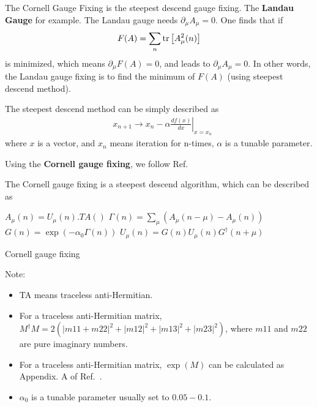 The Cornell Gauge Fixing is the steepest descend gauge fixing. The \textbf{Landau Gauge} for example. The Landau gauge needs $\partial _{\mu}A_{\mu}=0$. One finds that if
\begin{equation}
\begin{split}
&F(A)=\sum _n{\rm tr}\left[A_{\mu}^2(n)\right]\\
\end{split}
\end{equation}
is minimized, which means $\partial _{\mu}F(A)=0$, and leads to $\partial _{\mu}A_{\mu}=0$. In other words, the Landau gauge fixing is to find the minimum of $F(A)$ (using steepest descend method).

The steepest descend method can be simply described as
\begin{equation}
\begin{split}
&x_{n+1}\to x_n - \alpha \left.\frac{d f(x)}{dx}\right|_{x=x_n}
\end{split}
\end{equation}
where $x$ is a vector, and $x_n$ means iteration for n-times, $\alpha$ is a tunable parameter.

Using the \textbf{Cornell gauge fixing}, we follow Ref.~\cite{CornellGaugeFixing}

The Cornell gauge fixing is a steepest descend algorithm, which can be described as
\begin{algorithm}[H]
\begin{algorithmic}
    \State $A_{\mu}(n)=U_{\mu}(n).TA()$
    \State $\Gamma (n)=\sum _{\mu}(A_{\mu}(n-\mu)-A_{\mu}(n))$
        \Return
    \EndIf
    \State $G(n)=\exp \left(-\alpha _0\Gamma (n)\right)$
    \State $U_{\mu}(n)=G(n)U_{\mu}(n)G^{\dagger}(n+\mu)$
\EndFor
\end{algorithmic}
\caption{\label{alg.CornellGaugeFixing}Cornell gauge fixing}
\end{algorithm}

Note:
\begin{itemize}
  \item TA means traceless anti-Hermitian.
  \item For a traceless anti-Hermitian matrix, $M^{\dagger}M=2(|m11+m22|^2+|m12|^2+|m13|^2+|m23|^2)$, where $m11$ and $m22$ are pure imaginary numbers.
  \item For a traceless anti-Hermitian matrix, $\exp (M)$ can be calculated as Appendix. A of Ref.~\cite{luscher2005}.
  \item $\alpha _0$ is a tunable parameter usually set to $0.05 - 0.1$.
\end{itemize}

